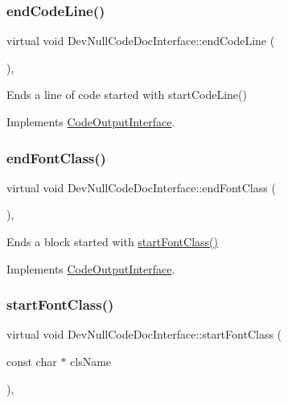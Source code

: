\subsubsection{\texorpdfstring{endCodeLine()}{endCodeLine()}}
{\footnotesize\ttfamily virtual void Dev\+Null\+Code\+Doc\+Interface\+::end\+Code\+Line (\begin{DoxyParamCaption}{ }\end{DoxyParamCaption})\hspace{0.3cm}{\ttfamily [inline]}, {\ttfamily [virtual]}}

Ends a line of code started with start\+Code\+Line() 

Implements \mbox{\hyperlink{class_code_output_interface_afac5763eafc78f93b82691fb9a6dcff7}{Code\+Output\+Interface}}.

\mbox{\label{class_dev_null_code_doc_interface_adb2939da13563e88a225059de3d767e5}} 
\subsubsection{\texorpdfstring{endFontClass()}{endFontClass()}}
{\footnotesize\ttfamily virtual void Dev\+Null\+Code\+Doc\+Interface\+::end\+Font\+Class (\begin{DoxyParamCaption}{ }\end{DoxyParamCaption})\hspace{0.3cm}{\ttfamily [inline]}, {\ttfamily [virtual]}}

Ends a block started with \mbox{\hyperlink{class_dev_null_code_doc_interface_a8489329a11f50e9d9ab1a3a67d306a51}{start\+Font\+Class()}} 

Implements \mbox{\hyperlink{class_code_output_interface_a2b8ac05a391dae36793aa3aa8714a0f6}{Code\+Output\+Interface}}.

\mbox{\label{class_dev_null_code_doc_interface_a8489329a11f50e9d9ab1a3a67d306a51}} 
\subsubsection{\texorpdfstring{startFontClass()}{startFontClass()}}
{\footnotesize\ttfamily virtual void Dev\+Null\+Code\+Doc\+Interface\+::start\+Font\+Class (\begin{DoxyParamCaption}\item[{const char $\ast$}]{cls\+Name }\end{DoxyParamCaption})\hspace{0.3cm}{\ttfamily [inline]}, {\ttfamily [virtual]}}

